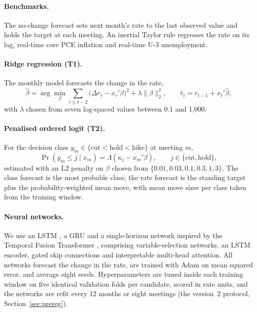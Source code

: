 \documentclass[11pt]{article}
\begin{document}
\paragraph{Benchmarks.}
The no-change forecast sets next month's rate to the last observed value and holds the target at each meeting.
An inertial Taylor rule \citep{taylor1993} regresses the rate on its lag, real-time core PCE inflation and
real-time U-3 unemployment.

\paragraph{Ridge regression (T1).}
The monthly model forecasts the change in the rate,
\begin{equation}
  \hat\beta = \arg\min_\beta \sum_{\tau\le t-2} \bigl(\Delta r_\tau - x_\tau'\beta\bigr)^2 + \lambda\lVert\beta\rVert_2^2,
  \qquad \hat r_t = r_{t-1} + x_t'\hat\beta,
\end{equation}
with $\lambda$ chosen from seven log-spaced values between 0.1 and 1,000.

\paragraph{Penalised ordered logit (T2).}
For the decision class $y_m\in\{\text{cut}<\text{hold}<\text{hike}\}$ at meeting $m$,
\begin{equation}
  \Pr(y_m\le j\mid x_m) = \Lambda(\kappa_j - x_m'\beta),\qquad j\in\{\text{cut},\text{hold}\},
\end{equation}
estimated with an L2 penalty on $\beta$ chosen from $\{0.01,0.03,0.1,0.3,1,3\}$. The class forecast is the most
probable class; the rate forecast is the standing target plus the probability-weighted mean move, with mean move
sizes per class taken from the training window.

\paragraph{Neural networks.}
We use an LSTM \citep{hochreiter1997}, a GRU \citep{cho2014} and a single-horizon network inspired by the Temporal
Fusion Transformer \citep[TFT;][]{lim2021}, comprising variable-selection networks, an LSTM encoder, gated skip
connections and interpretable multi-head attention. All networks forecast the change in the rate, are trained with
Adam on mean squared error, and average eight seeds. Hyperparameters are tuned inside each training window on five
identical validation folds per candidate, scored in rate units, and the networks are refit every 12 months or eight
meetings (the version~2 protocol, Section~\ref{sec:prereg}).
\end{document}
